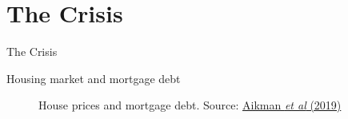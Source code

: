 \section{The Crisis}

\begin{frame}

\begin{center}
{\LARGE The Crisis}
\end{center}

\end{frame}



\begin{frame}{Housing market and mortgage debt}

\begin{figure}
\begin{center}


\caption{House prices and mortgage debt. Source: \href{https://pubs.aeaweb.org/doi/pdfplus/10.1257/jep.33.1.107}{Aikman \emph{et al} (2019)}}

\end{center}
\end{figure}

\end{frame}

